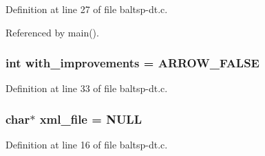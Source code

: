Definition at line 27 of file baltsp-dt.c.

Referenced by main().\hypertarget{bin_2baltsp-dt_8c_91079460b00ac08193d5ee47094f8f70}{
\subsubsection[{with\_\-improvements}]{\setlength{\rightskip}{0pt plus 5cm}int {\bf with\_\-improvements} = ARROW\_\-FALSE}}
\label{bin_2baltsp-dt_8c_91079460b00ac08193d5ee47094f8f70}




Definition at line 33 of file baltsp-dt.c.\hypertarget{bin_2baltsp-dt_8c_bf4e392494984c6ef8259268eb1fe421}{
\subsubsection[{xml\_\-file}]{\setlength{\rightskip}{0pt plus 5cm}char$\ast$ {\bf xml\_\-file} = NULL}}
\label{bin_2baltsp-dt_8c_bf4e392494984c6ef8259268eb1fe421}




Definition at line 16 of file baltsp-dt.c.